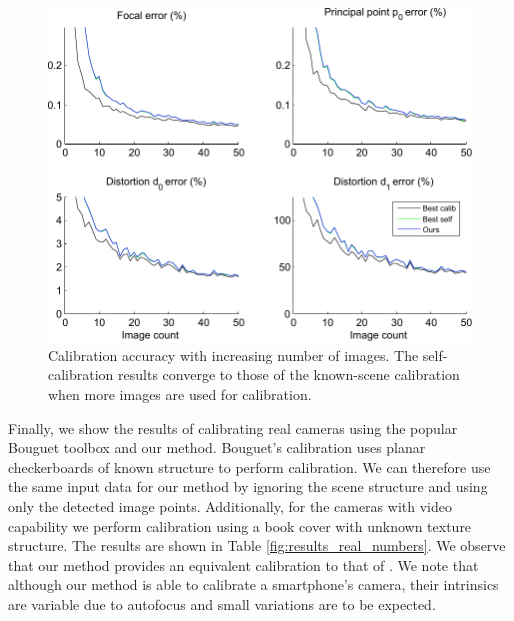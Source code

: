 \documentclass[10pt,twocolumn,letterpaper]{article}
\begin{document}
\begin{figure}
\centering
\includegraphics[width=\linewidth]{images/resultsFrameCount.pdf}
\caption{Calibration accuracy with increasing number of images. The self-calibration results converge to those of the known-scene calibration when more images are used for calibration.}
\label{fig:results_frames}
\end{figure}

Finally, we show the results of calibrating real cameras using the popular Bouguet toolbox \cite{bouguetMCT} and our method. Bouguet's calibration uses planar checkerboards of known structure to perform calibration. We can therefore use the same input data for our method by ignoring the scene structure and using only the detected image points. Additionally, for the cameras with video capability we perform calibration using a book cover with unknown texture structure. The results are shown in Table \ref{fig:results_real_numbers}. We observe that our method provides an equivalent calibration to that of \cite{bouguetMCT}. We note that although our method is able to calibrate a smartphone's camera, their intrinsics are variable due to autofocus and small variations are to be expected.
\end{document}

